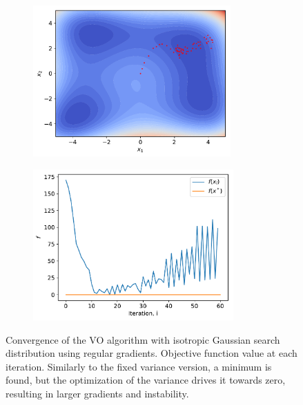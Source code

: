 \begin{figure}[tbp!]
    \begin{subfigure}[b]{0.49\textwidth}
        \centering
        \includegraphics[height=5.8cm]{graphics/var-opt-conv/VO-R-himmelblau-convergence.pdf}
        \caption{}
        \label{fig: Theory: var-opt-conv-VO-R-himmelblau-convergence}
    \end{subfigure}
    \hfill
    \begin{subfigure}[b]{0.49\textwidth}
        \centering
        \includegraphics[height=5.8cm]{graphics/var-opt-conv/VO-R-himmelblau-f.pdf}
        \caption{}
        \label{fig: Theory: var-opt-conv-VO-R-himmelblau-f}
    \end{subfigure}
    \caption{ Convergence of the \gls{VO} algorithm with isotropic Gaussian search distribution using regular gradients.  Objective function value at each iteration. Similarly to the fixed variance version, a minimum is found, but the optimization of the variance drives it towards zero, resulting in larger gradients and instability.}
    \label{fig: Theory: var-opt-conv-VO-R-himmelblau}
\end{figure}
